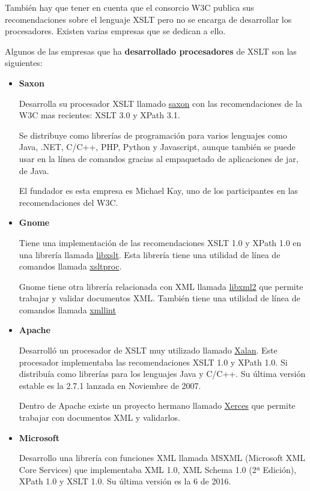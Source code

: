 También hay que tener en cuenta que el consorcio W3C publica sus recomendaciones sobre el lenguaje XSLT pero no se encarga de desarrollar los procesadores. Existen varias empresas que se dedican a ello.

Algunos de las empresas que ha \textbf{desarrollado procesadores} de XSLT son las siguientes:

\begin{itemize}
    \item \textbf{Saxon}

    Desarrolla su procesador XSLT llamado \href{https://www.saxonica.com/documentation11/index.html#!about/whatis}{saxon} con las recomendaciones de la W3C mas recientes: XSLT 3.0 y XPath 3.1.

    Se distribuye como librerías de programación para varios lenguajes como Java, .NET, C/C++, PHP, Python y Javascript, aunque también se puede usar en la línea de comandos gracias al empaquetado de aplicaciones de jar, de Java.

    El fundador es esta empresa es Michael Kay, uno de los participantes en las recomendaciones del W3C.

    \item \textbf{Gnome}

    Tiene una implementación de las recomendaciones XSLT 1.0 y XPath 1.0 en una librería llamada \href{https://gitlab.gnome.org/GNOME/libxslt/-/wikis/home}{libxslt}. Esta librería tiene una utilidad de línea de comandos llamada \href{https://gnome.pages.gitlab.gnome.org/libxslt/xsltproc.html}{xsltproc}.

    Gnome tiene otra librería relacionada con XML llamada \href{https://gitlab.gnome.org/GNOME/libxml2/-/wikis/home}{libxml2} que permite trabajar y validar documentos XML. También tiene una utilidad de línea de comandos llamada \href{https://gnome.pages.gitlab.gnome.org/libxml2/xmllint.html}{xmllint}

    \item \textbf{Apache}

    Desarrolló un procesador de XSLT muy utilizado llamado \href{https://xalan.apache.org/index.html}{Xalan}. Este procesador implementaba las recomendaciones XSLT 1.0 y XPath 1.0. Si distribuía como librerías para los lenguajes Java y C/C++. Su última versión estable es la 2.7.1 lanzada en Noviembre de 2007.

    Dentro de Apache existe un proyecto hermano llamado \href{https://xerces.apache.org/}{Xerces} que permite trabajar con documentos XML y validarlos.

    \item \textbf{Microsoft}

    Desarrollo una librería con funciones XML llamada MSXML (Microsoft XML Core Services) que implementaba XML 1.0, XML Schema 1.0 (2ª Edición), XPath 1.0 y XSLT 1.0. Su última versión es la 6 de 2016.
\end{itemize}

